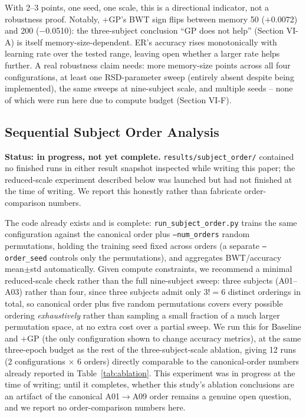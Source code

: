 \documentclass[conference]{IEEEtran}
\begin{document}
With 2--3 points, one seed, one scale, this is a directional indicator, not a robustness proof. Notably, +GP's BWT sign flips between memory 50 ($+$0.0072) and 200 ($-$0.0510): the three-subject conclusion ``GP does not help'' (Section VI-A) is itself memory-size-dependent. ER's accuracy rises monotonically with learning rate over the tested range, leaving open whether a larger rate helps further. A real robustness claim needs: more memory-size points across all four configurations, at least one RSD-parameter sweep (entirely absent despite being implemented), the same sweeps at nine-subject scale, and multiple seeds -- none of which were run here due to compute budget (Section VI-F).

\subsection{Sequential Subject Order Analysis}
\label{sec:order}

\textbf{Status: in progress, not yet complete.} \texttt{results/subject\_order/} contained no finished runs in either result snapshot inspected while writing this paper; the reduced-scale experiment described below was launched but had not finished at the time of writing. We report this honestly rather than fabricate order-comparison numbers.

The code already exists and is complete: \texttt{run\_subject\_order.py} trains the same configuration against the canonical order plus \texttt{--num\_orders} random permutations, holding the training seed fixed across orders (a separate \texttt{--order\_seed} controls only the permutations), and aggregates BWT/accuracy mean$\pm$std automatically. Given compute constraints, we recommend a minimal reduced-scale check rather than the full nine-subject sweep: three subjects (A01--A03) rather than four, since three subjects admit only $3!=6$ distinct orderings in total, so canonical order plus five random permutations covers every possible ordering \emph{exhaustively} rather than sampling a small fraction of a much larger permutation space, at no extra cost over a partial sweep. We run this for Baseline and +GP (the only configuration shown to change accuracy metrics), at the same three-epoch budget as the rest of the three-subject-scale ablation, giving 12 runs (2 configurations $\times$ 6 orders) directly comparable to the canonical-order numbers already reported in Table~\ref{tab:ablation}. This experiment was in progress at the time of writing; until it completes, whether this study's ablation conclusions are an artifact of the canonical A01$\to$A09 order remains a genuine open question, and we report no order-comparison numbers here.
\end{document}
